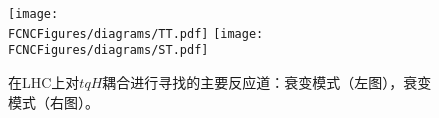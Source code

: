 
\begin{figure}[htb]
\centering
\texttt{[image: \\FCNCFigures/diagrams/TT.pdf]}
\texttt{[image: \\FCNCFigures/diagrams/ST.pdf]}\\
\caption{在LHC上对$tqH$耦合进行寻找的主要反应道：衰变模式（左图），衰变模式（右图）。}
\label{fig:diagrams}
\end{figure}
